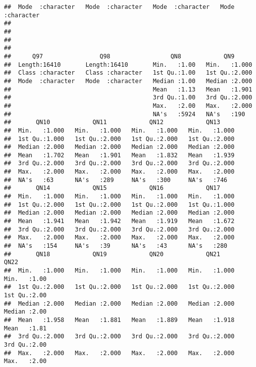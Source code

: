\documentclass[
]{article}
\begin{document}
\begin{verbatim}
##  Mode  :character   Mode  :character   Mode  :character   Mode  :character  
##                                                                             
##                                                                             
##                                                                             
##                                                                             
##      Q97                Q98                 QN8            QN9       
##  Length:16410       Length:16410       Min.   :1.00   Min.   :1.000  
##  Class :character   Class :character   1st Qu.:1.00   1st Qu.:2.000  
##  Mode  :character   Mode  :character   Median :1.00   Median :2.000  
##                                        Mean   :1.13   Mean   :1.901  
##                                        3rd Qu.:1.00   3rd Qu.:2.000  
##                                        Max.   :2.00   Max.   :2.000  
##                                        NA's   :5924   NA's   :190    
##       QN10            QN11            QN12            QN13      
##  Min.   :1.000   Min.   :1.000   Min.   :1.000   Min.   :1.000  
##  1st Qu.:1.000   1st Qu.:2.000   1st Qu.:2.000   1st Qu.:2.000  
##  Median :2.000   Median :2.000   Median :2.000   Median :2.000  
##  Mean   :1.702   Mean   :1.901   Mean   :1.832   Mean   :1.939  
##  3rd Qu.:2.000   3rd Qu.:2.000   3rd Qu.:2.000   3rd Qu.:2.000  
##  Max.   :2.000   Max.   :2.000   Max.   :2.000   Max.   :2.000  
##  NA's   :63      NA's   :289     NA's   :300     NA's   :746    
##       QN14            QN15            QN16            QN17      
##  Min.   :1.000   Min.   :1.000   Min.   :1.000   Min.   :1.000  
##  1st Qu.:2.000   1st Qu.:2.000   1st Qu.:2.000   1st Qu.:1.000  
##  Median :2.000   Median :2.000   Median :2.000   Median :2.000  
##  Mean   :1.941   Mean   :1.942   Mean   :1.919   Mean   :1.672  
##  3rd Qu.:2.000   3rd Qu.:2.000   3rd Qu.:2.000   3rd Qu.:2.000  
##  Max.   :2.000   Max.   :2.000   Max.   :2.000   Max.   :2.000  
##  NA's   :154     NA's   :39      NA's   :43      NA's   :280    
##       QN18            QN19            QN20            QN21            QN22     
##  Min.   :1.000   Min.   :1.000   Min.   :1.000   Min.   :1.000   Min.   :1.00  
##  1st Qu.:2.000   1st Qu.:2.000   1st Qu.:2.000   1st Qu.:2.000   1st Qu.:2.00  
##  Median :2.000   Median :2.000   Median :2.000   Median :2.000   Median :2.00  
##  Mean   :1.958   Mean   :1.881   Mean   :1.889   Mean   :1.918   Mean   :1.81  
##  3rd Qu.:2.000   3rd Qu.:2.000   3rd Qu.:2.000   3rd Qu.:2.000   3rd Qu.:2.00  
##  Max.   :2.000   Max.   :2.000   Max.   :2.000   Max.   :2.000   Max.   :2.00  

\end{verbatim}
\end{document}
